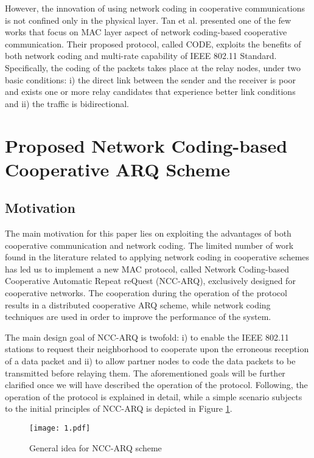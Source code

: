 \documentclass[conference]{IEEEtran}
\begin{document}
However, the innovation of using network coding in cooperative communications is not confined only in the physical layer. Tan et al. \cite{IEEEhowto:mr1} presented one of the few works that focus on MAC layer aspect of network coding-based cooperative communication. Their proposed protocol, called CODE, exploits the benefits of both network coding and multi-rate capability of IEEE 802.11 Standard. Specifically, the coding of the packets takes place at the relay nodes, under two basic conditions: i) the direct link between the sender and the receiver is poor and exists one or more relay candidates that experience better link conditions and ii) the traffic is bidirectional.
	
\section{Proposed Network Coding-based Cooperative ARQ Scheme}
\label{sec:ncc}

\subsection{Motivation}

The main motivation for this paper lies on exploiting the advantages of both cooperative communication and network coding. The limited number of work found in the literature related to applying network coding in cooperative schemes has led us to implement a new MAC protocol, called Network Coding-based Cooperative Automatic Repeat reQuest (NCC-ARQ), exclusively designed for cooperative networks. The cooperation during the operation of the protocol results in a distributed cooperative ARQ scheme, while network coding techniques are used in order to improve the performance of the system.

The main design goal of NCC-ARQ is twofold: i) to enable the IEEE 802.11 stations to request their neighborhood to cooperate upon the erroneous reception of a data packet and ii) to allow partner nodes to code the data packets to be transmitted before relaying them. The aforementioned goals will be further clarified once we will have described the operation of the protocol. Following, the operation of the protocol is explained in detail, while a simple scenario subjects to the initial principles of NCC-ARQ is depicted in Figure \ref{f1}.

\begin{figure}[htb]
\centering
\texttt{[image: 1.pdf]}
\caption{General idea for NCC-ARQ scheme}\label{f1}
\end{figure}
\end{document}
